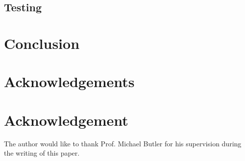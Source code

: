 \documentclass[12pt,journal,compsoc]{IEEEtran}
\begin{document}
\subsection{Testing}
\label{subsec:testing}

\section{Conclusion}
\label{sec:conclusion}

\appendices



\ifCLASSOPTIONcompsoc
  \section*{Acknowledgements}
\else
  \section*{Acknowledgement}
\fi

The author would like to thank Prof. Michael Butler for his supervision during the writing of this paper.


\ifCLASSOPTIONcaptionsoff
  \newpage
\fi




%
\end{document}
